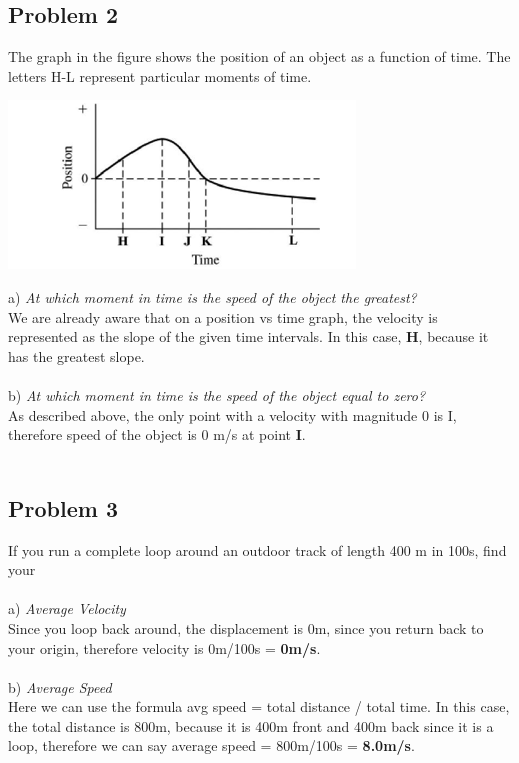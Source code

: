 \documentclass{article}
\begin{document}
\subsection{Problem 2} 
The graph in the figure shows the position of an object as a function of time. The letters H-L represent particular moments of time. 
\begin{center} 
\includegraphics[scale=0.6]{postlab2.png}
\end{center}
a) \textit{At which moment in time is the speed of the object the greatest?} \\ 
We are already aware that on a position vs time graph, the velocity is represented as the slope of the given time intervals. In this case, \textbf{H}, because it has the greatest slope.\\ \\ 
b) \textit{At which moment in time is the speed of the object equal to zero?} \\
As described above, the only point with a velocity with magnitude 0 is I, therefore speed of the object is 0 m/s at point \textbf{I}. \\ \\ 
\subsection{Problem 3} 
If you run a complete loop around an outdoor track of length 400 m in 100s, find your \\ \\
a) \textit{Average Velocity} \\
Since you loop back around, the displacement is 0m, since you return back to your origin, therefore velocity is 0m/100s = \textbf{0m/s}. \\ \\ 
b) \textit{Average Speed} \\
Here we can use the formula avg speed = total distance / total time. In this case, the total distance is 800m, because it is 400m front and 400m back since it is a loop, therefore we can say average speed = 800m/100s = \textbf{8.0m/s}. \\
\end{document}
